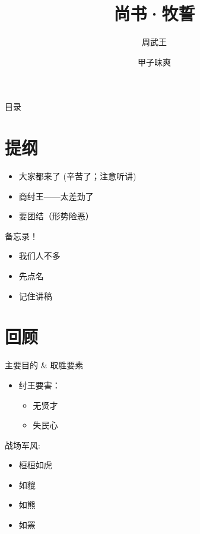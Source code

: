\documentclass{beamer}
\title{尚书·牧誓}
\author{周武王}
\institute{商郊牧野}
\date{甲子昧爽}
\begin{document}
\begin{frame}
  \titlepage
\end{frame}

\begin{frame}{目录}
  \tableofcontents
\end{frame}

\section{提纲}

\begin{frame}[fragile]{\insertsection}

\begin{itemize}
  \item 大家都来了 (辛苦了；注意听讲)
  \item 商纣王——太差劲了
  \item 要团结（形势险恶）
\end{itemize}

\end{frame}

\begin{frame}{备忘录！}

\begin{itemize}[<+->]
  \item 我们人不多
  \item 先点名
  \item 记住讲稿
\end{itemize}

\end{frame}

\section{回顾}

\begin{frame}{主要目的 \& 取胜要素}

\begin{itemize}
\item 纣王要害：
  \begin{itemize}
    \item  无贤才
    \item 失民心
  \end{itemize}
\end{itemize}

\begin{block}{战场军风:}
\begin{itemize}
\item 桓桓如虎
\item 如貔
\item 如熊
\item 如罴
\end{itemize}
\end{block}

\end{frame}
\end{document}
